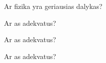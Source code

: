 \documentclass{exam}
\begin{document}
\begin{questions}
\raggedcolumns\begin{multicols}{2}
	\question Ar fizika yra geriausias dalykas? \begin{choices}
		\choice 
		\choice 
		\choice 
		\choice 
	\end{choices}
	\question Ar as adekvatus? \begin{choices}
		\choice 
		\choice 
		\choice 
		\choice 
	\end{choices}
	\question Ar as adekvatus? \begin{choices}
		\choice 
		\choice 
		\choice 
		\choice 
	\end{choices}
	\question Ar as adekvatus? \begin{choices}
		\choice 
		\choice 
		\choice 
		\choice
	\end{choices}
\end{multicols}
\end{questions}
\end{document}
